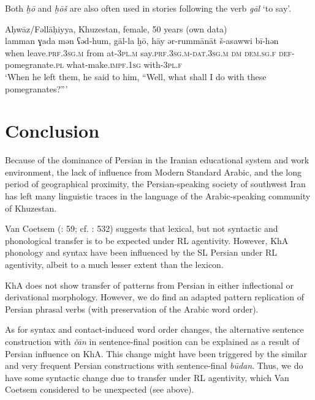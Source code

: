 \documentclass[output=paper,nonflat]{langsci/langscibook}
\begin{document}

Both \textit{ḫō} and \textit{ḫōš} are also often used in stories following the verb \textit{gāl} ‘to say’.

\ea\label{ex:key:}
{Aḥwāz/Fəllāḥiyya, Khuzestan, female, 50 years (own data)}\\
\gll lamman ɣada mən ʕəd-hum, gāl-la ḫō, hāy ər-rummānāt š-asawwi bī-hən\\
     when leave.\textsc{prf}.\textsc{3sg.m} from at-\textsc{3pl.m} say.\textsc{prf}.\textsc{3sg.m}-\textsc{dat.3sg.m} \textsc{dm} \textsc{dem}.\textsc{sg}.\textsc{f} \textsc{def}-pomegranate.\textsc{pl} what-make.\textsc{impf}.\textsc{1sg} with-\textsc{3pl.f}\\
\glt ‘When he left them, he said to him, ``Well, what shall I do with these pomegranates?”’
\z

\section{Conclusion}

Because of the dominance of Persian in the Iranian educational system and work environment, the lack of influence from Modern Standard Arabic, and the long period of geographical proximity, the Persian-speaking society of southwest Iran has left many linguistic traces in the language of the Arabic-speaking community of Khuzestan. 

Van Coetsem (\citeyear{VanCoetsem2000}: 59; cf. \citealt{Lucas2015}: 532) suggests that lexical, but not syntactic and phonological transfer is to be expected under RL agentivity. However, KhA phonology and syntax have been influenced by the SL Persian under RL agentivity, albeit to a much lesser extent than the lexicon.

KhA does not show transfer of patterns from Persian in either inflectional or derivational morphology. However, we do find an adapted pattern replication of Persian phrasal verbs (with preservation of the Arabic word order). 

As for syntax and contact-induced word order changes, the alternative sentence construction with \textit{čān} in sentence-final position can be explained as a result of Persian influence on KhA. This change might have been triggered by the similar and very frequent Persian constructions with sentence-final \textit{būdan}. Thus, we do have some syntactic change due to transfer under RL agentivity, which Van Coetsem considered to be unexpected (see above).
\end{document}
